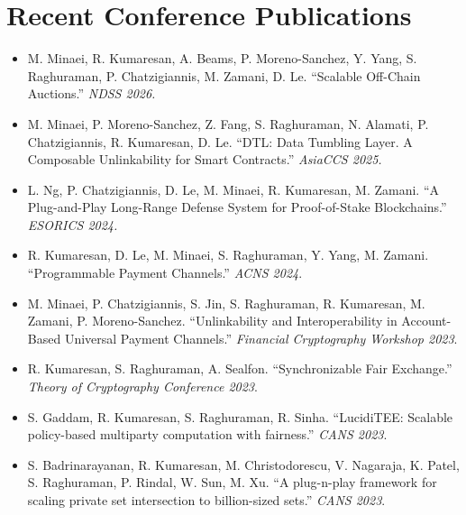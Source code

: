 \documentclass[11pt]{article}
\begin{document}
\section{Recent Conference Publications}
\begin{itemize}[leftmargin=*, noitemsep, topsep=0pt]
    \item M. Minaei, R. Kumaresan, A. Beams, P. Moreno-Sanchez, Y. Yang, S. Raghuraman, P. Chatzigiannis, M. Zamani, D. Le. ``Scalable Off-Chain Auctions.'' \textit{NDSS 2026.}
    \item M. Minaei, P. Moreno-Sanchez, Z. Fang, S. Raghuraman, N. Alamati, P. Chatzigiannis, R. Kumaresan, D. Le. ``DTL: Data Tumbling Layer. A Composable Unlinkability for Smart Contracts.'' \textit{AsiaCCS 2025.}
    \item L. Ng, P. Chatzigiannis, D. Le, M. Minaei, R. Kumaresan, M. Zamani. ``A Plug-and-Play Long-Range Defense System for Proof-of-Stake Blockchains.'' \textit{ESORICS 2024.}
    \item R. Kumaresan, D. Le, M. Minaei, S. Raghuraman, Y. Yang, M. Zamani. ``Programmable Payment Channels.'' \textit{ACNS 2024}.
    \item M. Minaei, P. Chatzigiannis, S. Jin, S. Raghuraman, R. Kumaresan, M. Zamani, P. Moreno-Sanchez. ``Unlinkability and Interoperability in Account-Based Universal Payment Channels.'' \textit{Financial Cryptography Workshop 2023}.
    \item R. Kumaresan, S. Raghuraman, A. Sealfon. ``Synchronizable Fair Exchange.'' \textit{Theory of Cryptography Conference 2023}.
    \item S. Gaddam, R. Kumaresan, S. Raghuraman, R. Sinha. ``LucidiTEE: Scalable policy-based multiparty computation with fairness.'' \textit{CANS 2023}.
    \item S. Badrinarayanan, R. Kumaresan, M. Christodorescu, V. Nagaraja, K. Patel, S. Raghuraman, P. Rindal, W. Sun, M. Xu. ``A plug-n-play framework for scaling private set intersection to billion-sized sets.'' \textit{CANS 2023}.
\end{itemize}
\end{document}
